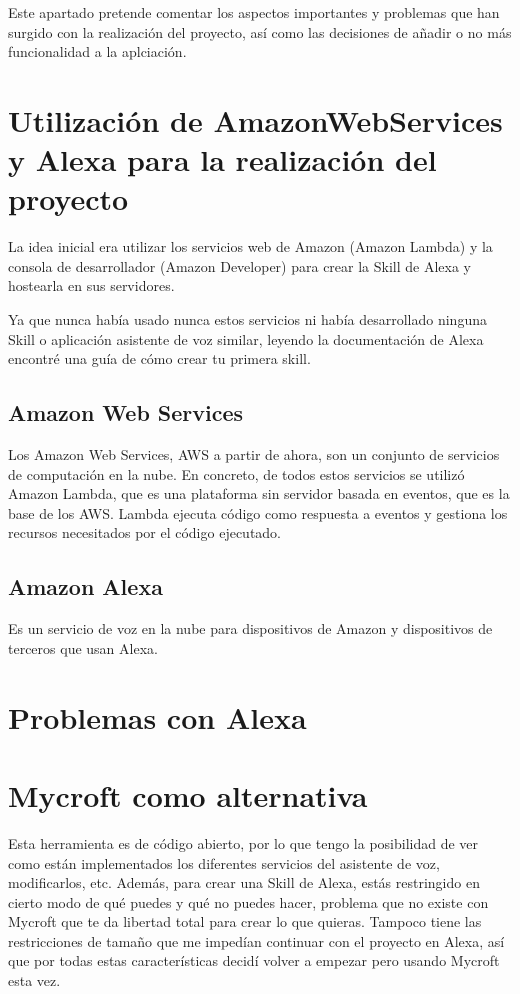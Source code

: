 
Este apartado pretende comentar los aspectos importantes y problemas que han surgido con la realización del proyecto, así como las decisiones de añadir o no más funcionalidad a la aplciación.

\section{Utilización de AmazonWebServices y Alexa para la realización del proyecto}

La idea inicial era utilizar los servicios web de Amazon (Amazon Lambda) y la consola de desarrollador (Amazon Developer) para crear la Skill de Alexa y hostearla en sus servidores.

Ya que nunca había usado nunca estos servicios ni había desarrollado ninguna Skill o aplicación asistente de voz similar, leyendo la documentación de Alexa encontré una guía de cómo crear tu primera skill.

\subsection{Amazon Web Services}

Los Amazon Web Services, AWS a partir de ahora, son un conjunto de servicios de computación en la nube. En concreto, de todos estos servicios se utilizó Amazon Lambda, que es una plataforma sin servidor basada en eventos, que es la base de los AWS. Lambda ejecuta código como respuesta a eventos y gestiona los recursos necesitados por el código ejecutado.

\subsection{Amazon Alexa}

Es un servicio de voz en la nube para dispositivos de Amazon y dispositivos de terceros que usan Alexa.

\section{Problemas con Alexa}


\section{Mycroft como alternativa}

Esta herramienta es de código abierto, por lo que tengo la posibilidad de ver como están implementados los diferentes servicios del asistente de voz, modificarlos, etc. Además, para crear una Skill de Alexa, estás restringido en cierto modo de qué puedes y qué no puedes hacer, problema que no existe con Mycroft que te da libertad total para crear lo que quieras. Tampoco tiene las restricciones de tamaño que me impedían continuar con el proyecto en Alexa, así que por todas estas características decidí volver a empezar pero usando Mycroft esta vez.

